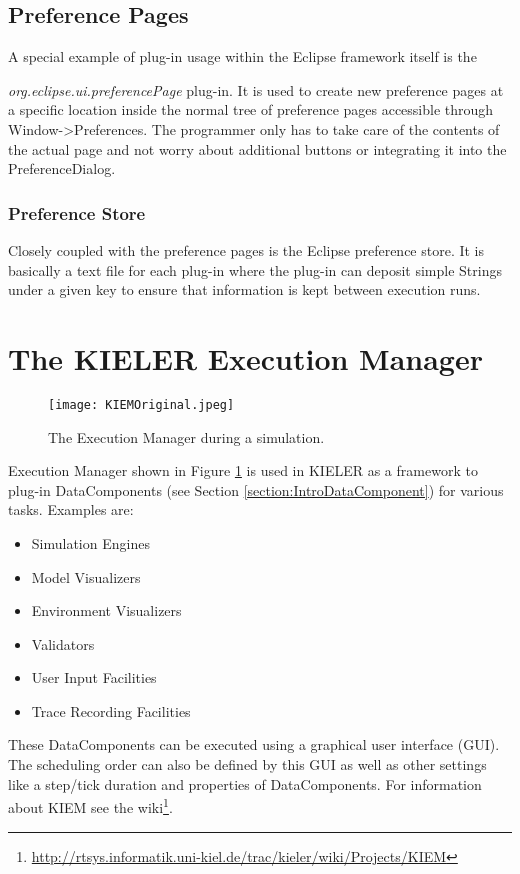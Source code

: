 \subsection{Preference Pages}
\label{section:TechPreferencePage}
A special example of plug-in usage within the Eclipse framework itself is the 

\textit{org.eclipse.ui.preferencePage} plug-in. 
It is used to create new preference pages at a specific location inside the
normal tree of preference pages accessible through Window->Preferences.
The programmer only has to take care of the contents of the actual page and not worry
about additional buttons or integrating it into the PreferenceDialog.

\subsubsection{Preference Store}
\label{section:TechPreferenceStore}
Closely coupled with the preference pages is the Eclipse preference store. It is
basically a text file for each plug-in where the plug-in can deposit simple Strings
under a given key to ensure that information is kept between execution runs.

\section{The KIELER Execution Manager}
\label{section:introKiem}
\begin{figure}
  \centering
  \texttt{[image: KIEMOriginal.jpeg]}
  \caption[The Execution Manager during a simulation.]%
  {The Execution Manager during a simulation.\protect}
  \label{fig:KIEMOriginal}
\end{figure}
Execution Manager shown in Figure \ref{fig:KIEMOriginal} is used in \ac{KIELER} as a framework 
to plug-in DataComponents (see Section \ref{section:IntroDataComponent}) for various tasks. Examples are:
\begin{itemize}
 \item Simulation Engines
 \item Model Visualizers
 \item Environment Visualizers
 \item Validators
 \item User Input Facilities
 \item Trace Recording Facilities 
\end{itemize}

These DataComponents can be executed using a graphical user interface (GUI). 
The scheduling order can also be defined by this GUI as well as other settings like a step/tick duration and properties of DataComponents.
For information about \ac{KIEM} see the wiki\footnote{\url{http://rtsys.informatik.uni-kiel.de/trac/kieler/wiki/Projects/KIEM}}.

